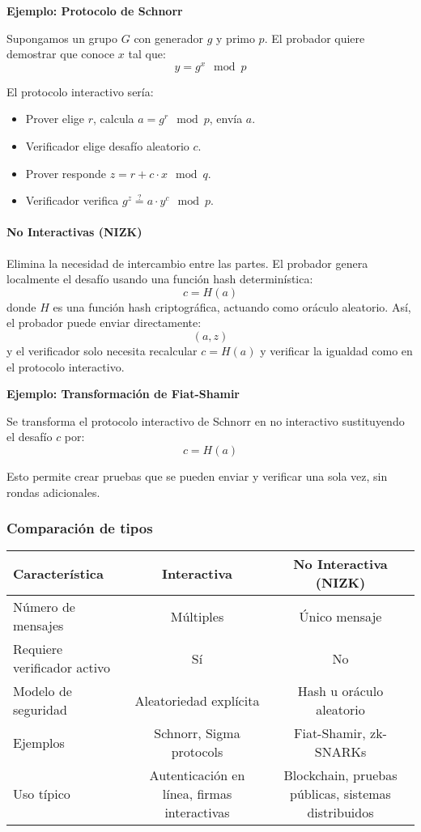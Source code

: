 \documentclass{article}
\begin{document}
\textbf{Ejemplo: Protocolo de Schnorr}

Supongamos un grupo \( G \) con generador \( g \) y primo \( p \). El probador quiere demostrar que conoce \( x \) tal que:
\[
y = g^x \mod p
\]

El protocolo interactivo sería:
\begin{itemize}
    \item Prover elige \( r \), calcula \( a = g^r \mod p \), envía \( a \).
    \item Verificador elige desafío aleatorio \( c \).
    \item Prover responde \( z = r + c \cdot x \mod q \).
    \item Verificador verifica \( g^z \stackrel{?}{=} a \cdot y^c \mod p \).
\end{itemize}

\paragraph{No Interactivas (NIZK)}

Elimina la necesidad de intercambio entre las partes. El probador genera localmente el desafío usando una función hash determinística:
\[
c = H(a)
\]
donde \( H \) es una función hash criptográfica, actuando como oráculo aleatorio. Así, el probador puede enviar directamente:
\[
(a, z)
\]
y el verificador solo necesita recalcular \( c = H(a) \) y verificar la igualdad como en el protocolo interactivo.

\textbf{Ejemplo: Transformación de Fiat-Shamir}

Se transforma el protocolo interactivo de Schnorr en no interactivo sustituyendo el desafío \( c \) por:
\[
c = H(a)
\]

Esto permite crear pruebas que se pueden enviar y verificar una sola vez, sin rondas adicionales.

\subsubsection{Comparación de tipos}

\begin{table}[h]
\centering
\begin{tabular}{|l|c|c|}
\hline
\textbf{Característica} & \textbf{Interactiva} & \textbf{No Interactiva (NIZK)} \\
\hline
Número de mensajes & Múltiples & Único mensaje \\
\hline
Requiere verificador activo & Sí & No \\
\hline
Modelo de seguridad & Aleatoriedad explícita & Hash u oráculo aleatorio \\
\hline
Ejemplos & Schnorr, Sigma protocols & Fiat-Shamir, zk-SNARKs \\
\hline
Uso típico & Autenticación en línea, firmas interactivas & Blockchain, pruebas públicas, sistemas distribuidos \\
\hline
\end{tabular}
\end{table}
\end{document}
